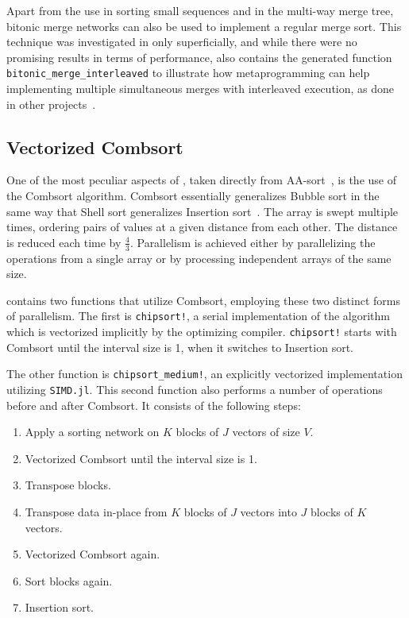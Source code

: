 \documentclass{juliacon}
\begin{document}
Apart from the use in sorting small sequences and in the multi-way merge tree, bitonic merge networks can also be used to implement a regular merge sort. This technique was investigated in \chipsort only superficially, and while there were no promising results in terms of performance, \chipsort also contains the generated function {\tt bitonic\_merge\_interleaved} to illustrate how metaprogramming can help implementing multiple simultaneous merges with interleaved execution, as done in other projects~\cite{DBLP:journals/pvldb/ChhuganiNLMHCBKD08}.

\subsection{Vectorized Combsort}
%
One of the most peculiar aspects of \chipsort, taken directly from AA-sort~\cite{DBLP:conf/IEEEpact/InoueMKN07,DBLP:journals/pvldb/InoueT15}, is the use of the Combsort algorithm. Combsort essentially generalizes Bubble sort in the same way that Shell sort generalizes Insertion sort~\cite{INCERPI198737,dobosiewicz1980efficient,Lacey:1991:FES:117187.117218,DBLP:books/lib/Knuth98a,DBLP:books/daglib/0023376}. The array is swept multiple times, ordering pairs of values at a given distance from each other. The distance is reduced each time by $\frac{4}{3}$. Parallelism is achieved either by parallelizing the operations from a single array or by processing independent arrays of the same size.

\chipsort contains two functions that utilize Combsort, employing these two distinct forms of parallelism. The first is {\tt chipsort!}, a serial implementation of the algorithm which is vectorized implicitly by the optimizing compiler. {\tt chipsort!} starts with Combsort until the interval size is 1, when it switches to Insertion sort.

The other function is {\tt chipsort\_medium!}, an explicitly vectorized implementation utilizing {\tt SIMD.jl}. This second function also performs a number of operations before and after Combsort. It consists of the following steps:
\begin{enumerate}
\item Apply a sorting network on $K$ blocks of $J$ vectors of size $V$.
\item Vectorized Combsort until the interval size is 1.
\item Transpose blocks.
\item Transpose data in-place from $K$ blocks of $J$ vectors into $J$ blocks of $K$ vectors.
\item Vectorized Combsort again.
\item Sort blocks again.
\item Insertion sort.
\end{enumerate}
\end{document}
